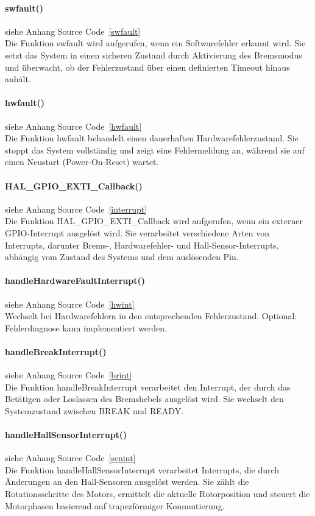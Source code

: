 \documentclass[paper=a4,11pt]{scrreprt}
\begin{document}
\paragraph{\textbf{swfault()}} siehe Anhang Source Code~\ref{swfault}\\
Die Funktion swfault wird aufgerufen, wenn ein Softwarefehler erkannt wird. Sie setzt das System in einen sicheren Zustand durch Aktivierung des Bremsmodus und überwacht, ob der Fehlerzustand über einen definierten Timeout hinaus anhält.
\paragraph{\textbf{hwfault()}} siehe Anhang Source Code~\ref{hwfault}\\
Die Funktion hwfault behandelt einen dauerhaften Hardwarefehlerzustand. Sie stoppt das System vollständig und zeigt eine Fehlermeldung an, während sie auf einen Neustart (Power-On-Reset) wartet.\\
\paragraph{\textbf{HAL\_GPIO\_EXTI\_Callback()}} siehe Anhang Source Code~\ref{interrupt}\\
Die Funktion HAL\_GPIO\_EXTI\_Callback wird aufgerufen, wenn ein externer GPIO-Interrupt ausgelöst wird. Sie verarbeitet verschiedene Arten von Interrupts, darunter Brems-, Hardwarefehler- und Hall-Sensor-Interrupts, abhängig vom Zustand des Systems und dem auslösenden Pin.\\
\paragraph{\textbf{handleHardwareFaultInterrupt()}} siehe Anhang Source Code~\ref{hwint}\\
Wechselt bei Hardwarefehlern in den entsprechenden Fehlerzustand. Optional: Fehlerdiagnose kann implementiert werden.
\paragraph{\textbf{handleBreakInterrupt()}} siehe Anhang Source Code~\ref{brint}\\
Die Funktion handleBreakInterrupt verarbeitet den Interrupt, der durch das Betätigen oder Loslassen des Bremshebels ausgelöst wird. Sie wechselt den Systemzustand zwischen BREAK und READY.
\paragraph{\textbf{handleHallSensorInterrupt()}} siehe Anhang Source Code~\ref{senint}\\
Die Funktion handleHallSensorInterrupt verarbeitet Interrupts, die durch Änderungen an den Hall-Sensoren ausgelöst werden. Sie zählt die Rotationsschritte des Motors, ermittelt die aktuelle Rotorposition und steuert die Motorphasen basierend auf trapezförmiger Kommutierung.
\end{document}
